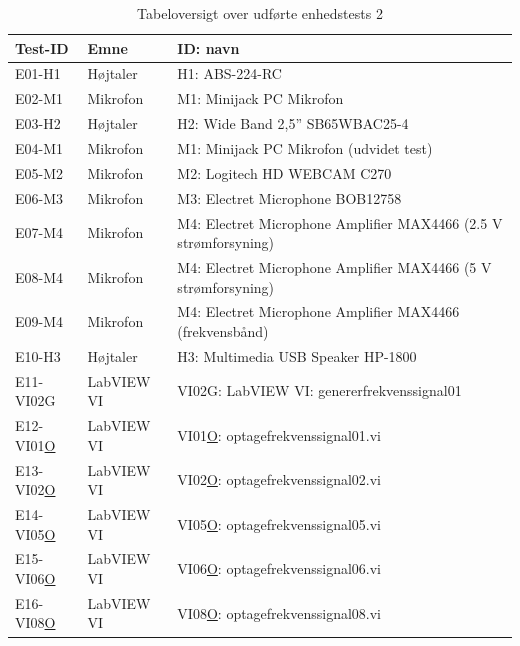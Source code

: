	\begin{table}[htb]
				\centering
				\caption{Tabeloversigt over udførte enhedstests 2} 
				\label{enhedstests 2}
				\begin{tabular}{lll}
					\multicolumn{1}{l|}{\textbf{Test-ID}} & 	
					\multicolumn{1}{l|}{\textbf{Emne}} & \textbf{ID: navn} \\ \hline
					\multicolumn{1}{l|}{E01-H1}& 
					\multicolumn{1}{l|}{Højtaler}&H1: ABS-224-RC\\
					\multicolumn{1}{l|}{E02-M1}& 
					\multicolumn{1}{l|}{Mikrofon}&M1: Minijack PC Mikrofon\\
					\multicolumn{1}{l|}{E03-H2}& 
					\multicolumn{1}{l|}{Højtaler}&H2: Wide Band 2,5'' SB65WBAC25-4\\
					\multicolumn{1}{l|}{E04-M1}& 
					\multicolumn{1}{l|}{Mikrofon}&M1: Minijack PC Mikrofon (udvidet test)\\
					\multicolumn{1}{l|}{E05-M2}& 
					\multicolumn{1}{l|}{Mikrofon}&M2: Logitech HD WEBCAM C270\\	
					\multicolumn{1}{l|}{E06-M3}& 
					\multicolumn{1}{l|}{Mikrofon}&M3: Electret Microphone BOB12758\\
						\multicolumn{1}{l|}{E07-M4}& 
					\multicolumn{1}{l|}{Mikrofon}&M4: Electret Microphone Amplifier MAX4466 (2.5 V strømforsyning)\\
					\multicolumn{1}{l|}{E08-M4}& 
					\multicolumn{1}{l|}{Mikrofon}&M4: Electret Microphone Amplifier MAX4466 (5 V strømforsyning)\\
					\multicolumn{1}{l|}{E09-M4}& 
					\multicolumn{1}{l|}{Mikrofon}&M4: Electret Microphone Amplifier MAX4466 (frekvensbånd)\\
					\multicolumn{1}{l|}{E10-H3}& 
					\multicolumn{1}{l|}{Højtaler}&H3: Multimedia USB Speaker HP-1800\\
						
					\multicolumn{1}{l|}{E11-VI02G}& 
					\multicolumn{1}{l|}{LabVIEW VI}&VI02G: LabVIEW VI: genererfrekvenssignal01\\
					\multicolumn{1}{l|}{E12-VI01\underline{O}}& 
					\multicolumn{1}{l|}{LabVIEW VI}&VI01\underline{O}: optagefrekvenssignal01.vi\\
					\multicolumn{1}{l|}{E13-VI02\underline{O}}& 
					\multicolumn{1}{l|}{LabVIEW VI}&VI02\underline{O}: optagefrekvenssignal02.vi\\
					\multicolumn{1}{l|}{E14-VI05\underline{O}}& 
					\multicolumn{1}{l|}{LabVIEW VI}&VI05\underline{O}: optagefrekvenssignal05.vi\\
					\multicolumn{1}{l|}{E15-VI06\underline{O}}& 
					\multicolumn{1}{l|}{LabVIEW VI}&VI06\underline{O}: optagefrekvenssignal06.vi\\
					\multicolumn{1}{l|}{E16-VI08\underline{O}}& 
					\multicolumn{1}{l|}{LabVIEW VI}&VI08\underline{O}: optagefrekvenssignal08.vi\\
								
				\end{tabular}
			\end{table}
	
